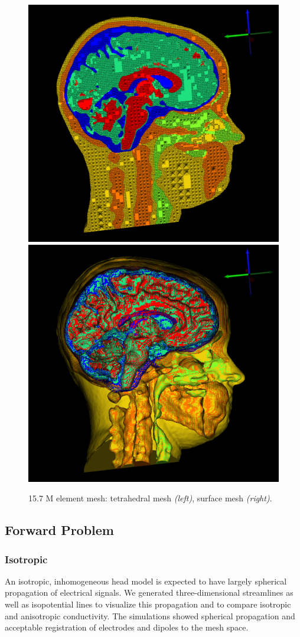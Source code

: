 \begin{figure}[H]
\begin{center}
\includegraphics[width=.49\textwidth]{Figures/smallmesh_2}
\includegraphics[width=.49\textwidth]{Figures/smallmesh_surface}
\caption{15.7 M element mesh: tetrahedral mesh \textit{(left)}, surface mesh \textit{(right)}.}
\label{fig:smallmesh}
\end{center}
\end{figure}

\subsection{Forward Problem}

\subsubsection{Isotropic}

An isotropic, inhomogeneous head model is expected to have largely spherical propagation of electrical signals. We generated three-dimensional streamlines as well as isopotential lines to visualize this propagation and to compare isotropic and anisotropic conductivity. The simulations showed spherical propagation and acceptable registration of electrodes and dipoles to the mesh space.

